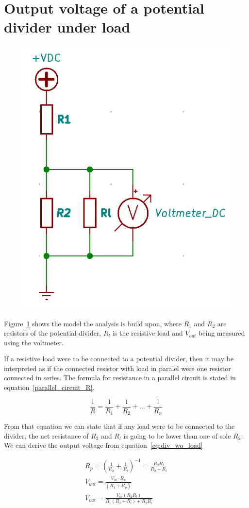 \documentclass{article}
\begin{document}
\section{Output voltage of a potential divider under load}

    \begin{figure}[H]
        \caption
        \centering
        \includegraphics[width=0.3\linewidth]{divider_1}
        \label{fig:divider_1}
    \end{figure}

    Figure~\ref{fig:divider_1} shows the model the analysis is build upon, where $R_1$ and $R_2$ are
    resistors of the potential divider, $R_l$ is the resistive load and $V_{out}$ being measured using
    the voltmeter.

    If a resistive load were to be connected to a potential divider, then it may be interpreted as
    if the connected resistor with load in paralel were one resistor connected in series. The formula
    for resistance in a parallel circuit is stated in equation~\eqref{parallel_circuit_R}.

    \begin{equation}\label{parallel_circuit_R}
        \frac{1}{R} = \frac{1}{R_1} + \frac{1}{R_2} + ... + \frac{1}{R_n}
    \end{equation}
    
    From that equation we can state that if any load were to be connected to the divider, the net 
    resistance of $R_2$ and $R_l$ is going to be lower than one of sole $R_2$. We can derive the 
    output voltage from equation~\eqref{eq:div_wo_load}
    
    \begin{align}
        R_p = (\frac{1}{R_2} + \frac{1}{R_l})^{-1} = \frac{R_2R_l}{R_2 + R_l} \\
        V_{out} = \frac{V_{in} \cdot R_p}{(R_1 + R_p)} \\
        V_{out} = \frac{V_{in}(R_2R_l)}{R_1(R_2 + R_l) + R_2R_l} \label{ohm_derived}
    \end{align}
\end{document}
